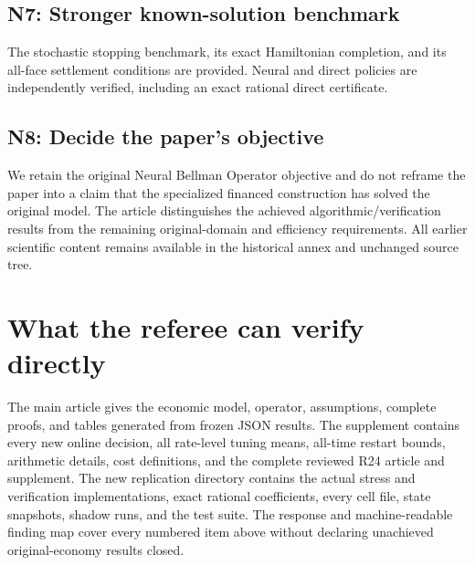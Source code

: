 \subsection{N7: Stronger known-solution benchmark}
The stochastic stopping benchmark, its exact Hamiltonian completion, and its all-face settlement conditions are provided. Neural and direct policies are independently verified, including an exact rational direct certificate.
\subsection{N8: Decide the paper's objective}
We retain the original Neural Bellman Operator objective and do not reframe the paper into a claim that the specialized financed construction has solved the original model. The article distinguishes the achieved algorithmic/verification results from the remaining original-domain and efficiency requirements. All earlier scientific content remains available in the historical annex and unchanged source tree.

\section{What the referee can verify directly}
The main article gives the economic model, operator, assumptions, complete proofs, and tables generated from frozen JSON results. The supplement contains every new online decision, all rate-level tuning means, all-time restart bounds, arithmetic details, cost definitions, and the complete reviewed R24 article and supplement. The new replication directory contains the actual stress and verification implementations, exact rational coefficients, every cell file, state snapshots, shadow runs, and the test suite. The response and machine-readable finding map cover every numbered item above without declaring unachieved original-economy results closed.
